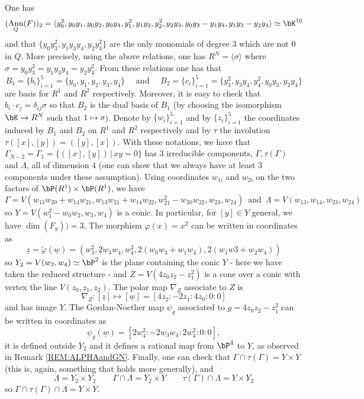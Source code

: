 \documentclass[a4paper,11pt]{amsart}
\DeclareMathOperator{\Ann}{Ann}
\begin{document}
One has 
$$(\Ann_Q(F))_2=\langle y_0^2,y_0y_1,y_0y_2,y_0y_4,y_1^2,y_1y_2,y_2^2,y_2y_3,y_0y_3-y_1y_4,y_1y_3-y_2y_4\rangle\simeq \bK^{10}$$
and that $\{y_0y_3^2,y_1y_3y_4,y_2y_4^2\}$ are the only monomials of degree $3$ which are not $0$ in $Q$. More precisely, using the above relations, one has $R^N=\langle \sigma\rangle$ where $\sigma=y_0y_3^2=y_1y_3y_4=y_2y_4^2$. 
From these relations one has that
$$B_1=\{b_i\}_{i=1}^5=\{y_0,y_1,y_2,y_3,y_4\}\quad \mbox{ and }\quad B_2=\{c_i\}_{i=1}^5=\{y_3^2,y_3y_4,y_4^2,y_0y_3,y_2y_4\}$$
are basis for $R^1$ and $R^2$ respectively. Moreover, it is easy to check that $b_i\cdot c_j=\delta_{ij}\sigma$ so that $B_2$ is the dual basis of $B_1$ (by choosing the isomorphism $\bK\to R^N$ such that $1\mapsto\sigma$). Denote by $\{w_i\}_{i=1}^5$ and by $\{z_i\}_{i=1}^5$ the coordinates induced by $B_1$ and $B_2$ on $R^1$ and $R^2$  respectively and by $\tau$ the involution $\tau([x],[y])=([y],[x])$. With these notations, we have
that $\Gamma_{N-2}=\Gamma_{1}=\{([x],[y])\,|\, xy=0\}$ has $3$ irreducible components, $\Gamma,\tau(\Gamma)$ and $\Lambda$, all of dimension $4$ (one can show that we always have at least $3$ components under these assumption). Using coordinates $w_{1i}$ and $w_{2i}$ on the two factors of $\bP(R^1)\times \bP(R^1)$, we have
$$\Gamma=V(w_{13}w_{20}+w_{14}w_{21},w_{13}w_{21}+w_{14}w_{22}, w_{21}^2-w_{20}w_{22},w_{23},w_{24})\, \mbox{ and }\, \Lambda=V(w_{13},w_{14},w_{23},w_{24})$$
so
$Y=V(w_1^2-w_0w_2,w_3,w_4)$ is a conic. In particular, for $[y]\in Y$ general, we have $\dim(F_y))=3$. The morphism $\varphi(x)=x^2$ can be written in coordinates as
$$\underline{z}=\tilde{\varphi}(\underline{w})=(w_3^2,2w_3w_4,w_4^2,2(w_0w_3+w_1w_4),2(w_1w3+w_2w_4))$$
so $Y_2=V(w_3,w_4)\simeq \bP^2$ is the plane containing the conic $Y$ - here we have taken the reduced structure - and $Z=V(4z_0z_2-z_1^2)$ is a cone over a conic with vertex the line $V(z_0,z_1,z_2)$. The polar map $\nabla_Z$ associate to $Z$ is
$$\nabla_Z: [\underline{z}]\mapsto [\underline{w}]=[4z_2:-2z_1:4z_0:0:0]$$
and has image $Y$. The Gordan-Noether map $\psi_g$ associated to $g=4z_0z_2-z_1^2$ can be written in coordinates as
$$\psi_g(\underline{w})=[2w_4^2:-2w_3w_4:2w_4^2:0:0],$$
it is defined outside $Y_2$ and it defines a rational map from $\bP^4$ to $Y$, as observed in Remark \ref{REM:ALPHAandGN}. Finally, one can check that 
$\Gamma\cap \tau(\Gamma)=Y\times Y$ (this is, again, something that holds more generally), and
$$\Lambda=Y_2\times Y_2\qquad \Gamma\cap \Lambda=Y_2\times Y\qquad \tau(\Gamma)\cap \Lambda=Y\times Y_2$$
so $\Gamma\cap \tau(\Gamma)\cap \Lambda = Y\times Y$.
\end{document}
